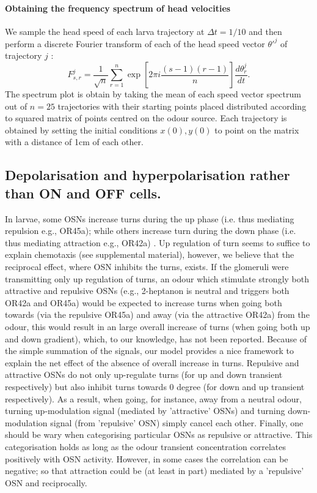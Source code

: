 \paragraph{Obtaining the frequency spectrum of head velocities}
We sample the head speed of each larva trajectory at $\Delta t = 1/10$ and then perform a discrete Fourier transform of each of the head speed vector $\theta'^j$ of trajectory $j$ :
\begin{equation}
F_{s,r}^j = \frac{1}{\sqrt{n}} \sum_{r=1}^n \exp{\left[2 \pi i \frac{ (s-1)(r-1)}{n}\right]} \frac{d\theta_r^j}{dt}.
\end{equation}
The spectrum plot is obtain by taking the mean of each speed vector spectrum out of $n=25$ trajectories with their starting points placed distributed according to squared matrix of points centred on the odour source. Each trajectory is obtained by setting the initial conditions $x(0),y(0)$ to point on the matrix with a distance of 1cm of each other.

\subsection{Depolarisation and hyperpolarisation rather than ON and OFF cells.}
In larvae, some OSNs increase turns during the up phase (i.e. thus mediating repulsion e.g., OR45a); while others increase turn during the down phase (i.e. thus mediating attraction e.g., OR42a) \citep{hernandez2015reverse}.
 Up regulation of turn seems to suffice to explain chemotaxis (see supplemental material), however, we believe that the reciprocal effect, where OSN inhibits the turns, exists.
 If the glomeruli were transmitting only up regulation of turns, an odour which stimulate strongly both attractive and repulsive OSNs (e.g., 2-heptanon is neutral and triggers both OR42a and OR45a) would be expected to increase turns when going both towards (via the repulsive OR45a) and away (via the attractive OR42a) from the odour, this would result in an large overall increase of turns (when going both up and down gradient), which, to our knowledge, has not been reported. Because of the simple summation of the signals, our model provides a nice framework to explain the net effect of the absence of overall increase in turns.
 Repulsive and attractive OSNs do not only up-regulate turns (for up and down transient respectively) but also inhibit turns towards 0 degree (for down and up transient respectively). As a result, when going, for instance, away from a neutral odour, turning up-modulation signal (mediated by 'attractive' OSNs) and turning down-modulation signal (from 'repulsive' OSN) simply cancel each other.
  Finally, one should be wary when categorising particular OSNs as repulsive or attractive. This categorisation holds as long as the odour transient concentration correlates positively with OSN activity. However, in some cases the correlation can be negative; so that attraction could be (at least in part) mediated by a 'repulsive' OSN and reciprocally.

